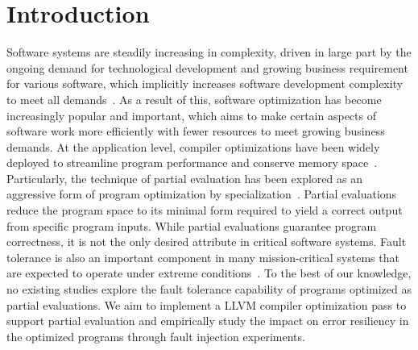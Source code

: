 \section{Introduction}

Software systems are steadily increasing in complexity, driven in large part by the ongoing demand for technological development and growing business requirement for various software, which implicitly increases software development complexity to meet all demands~\cite{Lyu}. 
As a result of this, software optimization has become increasingly popular and important, which aims to make certain aspects of software work more efficiently with fewer resources to meet growing business demands.
At the application level, compiler optimizations have been widely deployed to streamline program performance and conserve memory space~\cite{Zhou}.
Particularly, the technique of partial evaluation has been explored as an aggressive form of program optimization by specialization~\cite{Jones1993}.
Partial evaluations reduce the program space to its minimal form required to yield a correct output from specific program inputs.
While partial evaluations guarantee program correctness, it is not the only desired attribute in critical software systems.
Fault tolerance is also an important component in many mission-critical systems that are expected to operate under extreme conditions~\cite{Somani}.
To the best of our knowledge, no existing studies explore the fault tolerance capability of programs optimized as partial evaluations.
We aim to implement a LLVM compiler optimization pass to support partial evaluation and empirically study the impact on error resiliency in the optimized programs through fault injection experiments.
